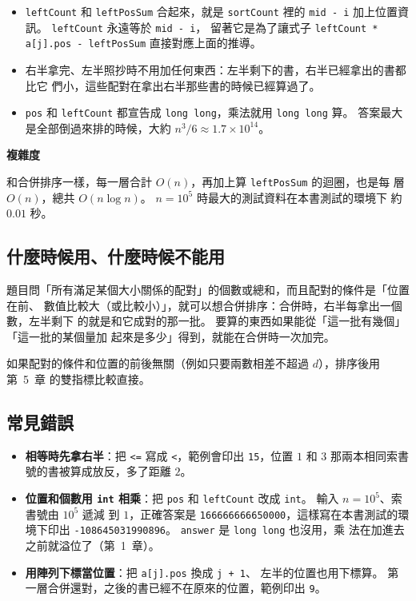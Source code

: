 
\begin{itemize}
\item \texttt{leftCount} 和 \texttt{leftPosSum} 合起來，就是 \texttt{sortCount}
裡的 \texttt{mid - i} 加上位置資訊。 \texttt{leftCount} 永遠等於 \texttt{mid - i}，
留著它是為了讓式子 \texttt{leftCount * a[j].pos - leftPosSum} 直接對應上面的推導。
\item 右半拿完、左半照抄時不用加任何東西：左半剩下的書，右半已經拿出的書都比它
們小，這些配對在拿出右半那些書的時候已經算過了。
\item \texttt{pos} 和 \texttt{leftCount} 都宣告成 \texttt{long long}，乘法就用
\texttt{long long} 算。 答案最大是全部倒過來排的時候，大約 $n^3/6 \approx 1.7
\times 10^{14}$。
\end{itemize}

\textbf{複雜度}

和合併排序一樣，每一層合計 $O(n)$，再加上算 \texttt{leftPosSum} 的迴圈，也是每
層 $O(n)$，總共 $O(n \log n)$。 $n = 10^5$ 時最大的測試資料在本書測試的環境下
約 $0.01$ 秒。

\subsection{什麼時候用、什麼時候不能用}

題目問「所有滿足某個大小關係的配對」的個數或總和，而且配對的條件是「位置在前、
數值比較大（或比較小）」，就可以想合併排序：合併時，右半每拿出一個數，左半剩下
的就是和它成對的那一批。 要算的東西如果能從「這一批有幾個」「這一批的某個量加
起來是多少」得到，就能在合併時一次加完。

如果配對的條件和位置的前後無關（例如只要兩數相差不超過 $d$），排序後用第~5~章
的雙指標比較直接。

\subsection{常見錯誤}

\begin{itemize}
\item \textbf{相等時先拿右半}：把 \texttt{<=} 寫成 \texttt{<}，範例會印出
\texttt{15}，位置 $1$ 和 $3$ 那兩本相同索書號的書被算成放反，多了距離 $2$。
\item \textbf{位置和個數用 \texttt{int} 相乘}：把 \texttt{pos} 和
\texttt{leftCount} 改成 \texttt{int}。 輸入 $n = 10^5$、索書號由 $10^5$ 遞減
到 $1$，正確答案是 \texttt{166666666650000}，這樣寫在本書測試的環境下印出
\texttt{-108645031990896}。 \texttt{answer} 是 \texttt{long long} 也沒用，乘
法在加進去之前就溢位了（第~1~章）。
\item \textbf{用陣列下標當位置}：把 \texttt{a[j].pos} 換成 \texttt{j + 1}、
左半的位置也用下標算。 第一層合併還對，之後的書已經不在原來的位置，範例印出
\texttt{9}。
\end{itemize}


